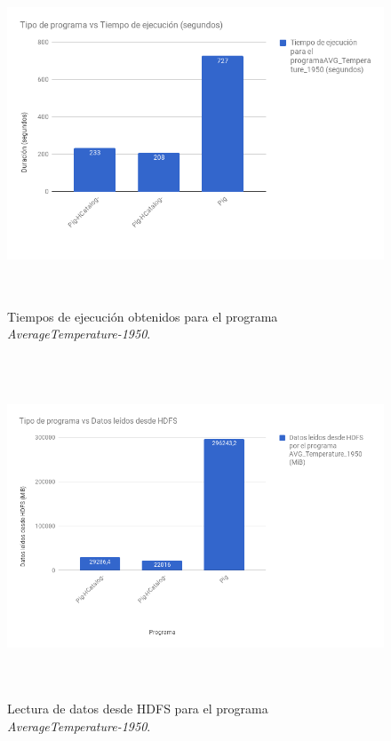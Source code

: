 \begin{figure}[H]
  \centering
      \includegraphics[width=\textwidth, height=4.0in]{fig/07/03_01}
  \caption{Tiempos de ejecución obtenidos para el programa \textit{AverageTemperature-1950}.}
  \label{07_03_01}
\end{figure}

\begin{figure}[H]
  \centering
      \includegraphics[width=\textwidth, height=4.0in]{fig/07/03_02}
  \caption{Lectura de datos desde HDFS para el programa \textit{AverageTemperature-1950}.}
  \label{07_03_02}
\end{figure}

